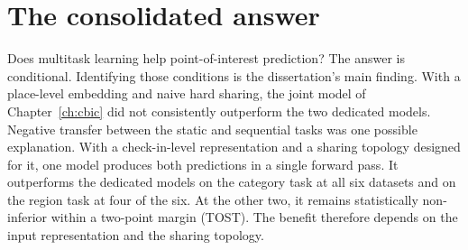 \section{The consolidated answer}
\label{sec:conc:answer}

Does multitask learning help point-of-interest prediction? The answer is conditional.
Identifying those conditions is the dissertation's main finding. With a place-level
embedding and naive hard sharing, the joint model of Chapter~\ref{ch:cbic} did not
consistently outperform the two dedicated models. Negative transfer between the static
and sequential tasks was one possible explanation. With a check-in-level
representation and a sharing topology designed for it, one model produces both
predictions in a single forward pass. It outperforms the dedicated models on the
category task at all six datasets and on the region task at four of the six. At the
other two, it remains statistically non-inferior within a two-point margin (TOST).
The benefit therefore depends on the input representation and the sharing topology.
